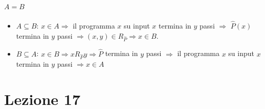 \documentclass{article}
\begin{document}
\paragraph{$A=B$}
\begin{itemize}
	\item $A\subseteq B$: $x \in A \Rightarrow$ il programma $x$ su input $x$ termina in $y$ passi $\Rightarrow$ $\hat{P}(x)$ termina in $y$ passi $\Rightarrow (x,y) \in R_{\hat{P}} \Rightarrow x \in B$.
	\item $B \subseteq A$: $x \in B \Rightarrow x R_{\hat{P}} y \Rightarrow \hat{P}$ termina in $y$ passi $\Rightarrow$ il programma $x$ su input $x$ termina in $y$ passi $\Rightarrow x \in A$ 
\end{itemize}

\section{Lezione 17}
\end{document}
